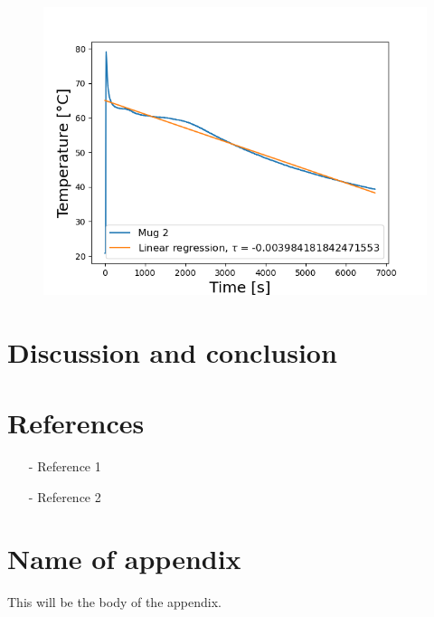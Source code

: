 \documentclass[reprint,english,notitlepage]{revtex4-2}
\begin{document}
\begin{figure}
  \includegraphics[scale=0.5]{tau_b.png}
  \caption{}\label{fig: tau_b}
\end{figure}
\FloatBarrier

\section{Discussion and conclusion}




\section*{References}  %
\begin{itemize}
\item[-]Reference 1
\item[-]Reference 2
\end{itemize}

\newpage
\appendix
\section{Name of appendix}
This will be the body of the appendix.
\end{document}
